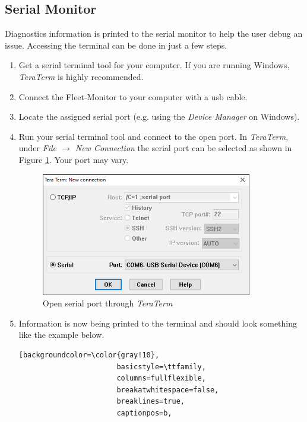 \newpage

\subsection{Serial Monitor} \label{Serial Monitor}
Diagnostics information is printed to the serial monitor to help the user debug an issue. Accessing the terminal can be done in just a few steps.

\begin{enumerate}
  \item Get a serial terminal tool for your computer. If you are running Windows, \mbox{\textit{TeraTerm}} is highly recommended. 
  \item Connect the Fleet-Monitor to your computer with a \acrshort{usb} cable.
  \item Locate the assigned serial port (e.g. using the \textit{Device Manager} on Windows).
  \item Run your serial terminal tool and connect to the open port. In \mbox{\textit{TeraTerm}}, under \textit{File {$\rightarrow$} New Connection} the serial port can be selected as shown in Figure \ref{fig:tera-connect}. Your port may vary. 
  \begin{figure}[h!]
	\centering
	\includegraphics[width=9.2cm]{images/tera-connect}
	\caption{Open serial port through \mbox{\textit{TeraTerm}}}
	\label{fig:tera-connect}
\end{figure}
    \item Information is now being printed to the terminal and should look something like the example below.
    \bigskip
    \begin{lstlisting}[backgroundcolor=\color{gray!10},  
                       basicstyle=\ttfamily,
                       columns=fullflexible,
                       breakatwhitespace=false,      
                       breaklines=true,                
                       captionpos=b,                    

\end{lstlisting}
\end{enumerate}

